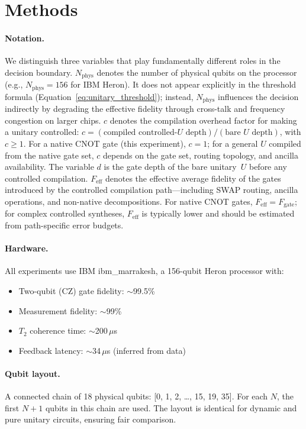 \documentclass[11pt]{article}
\begin{document}
\section{Methods}

\paragraph{Notation.}
We distinguish three variables that play fundamentally different roles in the decision boundary.
$N_{\text{phys}}$ denotes the number of physical qubits on the processor (e.g., $N_{\text{phys}} = 156$ for IBM Heron).
It does not appear explicitly in the threshold formula (Equation~\ref{eq:unitary_threshold}); instead, $N_{\text{phys}}$ influences the decision indirectly by degrading the effective fidelity through cross-talk and frequency congestion on larger chips.
$c$ denotes the compilation overhead factor for making a unitary controlled: $c = (\text{compiled controlled-}U \text{ depth}) / (\text{bare } U \text{ depth})$, with $c \geq 1$.
For a native CNOT gate (this experiment), $c = 1$; for a general $U$ compiled from the native gate set, $c$ depends on the gate set, routing topology, and ancilla availability.
The variable $d$ is the gate depth of the bare unitary~$U$ before any controlled compilation.
$F_{\text{eff}}$ denotes the effective average fidelity of the gates introduced by the controlled compilation path---including SWAP routing, ancilla operations, and non-native decompositions.
For native CNOT gates, $F_{\text{eff}} = F_{\text{gate}}$; for complex controlled syntheses, $F_{\text{eff}}$ is typically lower and should be estimated from path-specific error budgets.

\paragraph{Hardware.}
All experiments use IBM ibm\_marrakesh, a 156-qubit Heron processor with:
\begin{itemize}
  \item Two-qubit (CZ) gate fidelity: $\sim$99.5\%
  \item Measurement fidelity: $\sim$99\%
  \item $T_2$ coherence time: $\sim$200\,$\mu$s
  \item Feedback latency: $\sim$34\,$\mu$s (inferred from data)
\end{itemize}

\paragraph{Qubit layout.}
A connected chain of 18 physical qubits: [0, 1, 2, \ldots, 15, 19, 35].
For each $N$, the first $N+1$ qubits in this chain are used.
The layout is identical for dynamic and pure unitary circuits, ensuring fair comparison.
\end{document}
